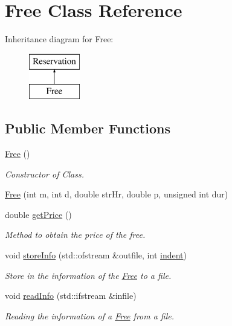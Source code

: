 \hypertarget{class_free}{}\section{Free Class Reference}
\label{class_free}
Inheritance diagram for Free\+:\begin{figure}[H]
\begin{center}
\leavevmode
\includegraphics[height=2.000000cm]{class_free}
\end{center}
\end{figure}
\subsection*{Public Member Functions}
\begin{DoxyCompactItemize}
\item 
\mbox{\label{class_free_a4a847fee0a934284fc4581282706e885}} 
\mbox{\hyperlink{class_free_a4a847fee0a934284fc4581282706e885}{Free}} ()
\begin{DoxyCompactList}\small\item\em Constructor of Class. \end{DoxyCompactList}\item 
\mbox{\hyperlink{class_free_afe1bb925d237595d9fd75fb2e7772314}{Free}} (int m, int d, double str\+Hr, double p, unsigned int dur)
\item 
double \mbox{\hyperlink{class_free_a229f009a7535eeba0a6ff4495de8c6bf}{get\+Price}} ()
\begin{DoxyCompactList}\small\item\em Method to obtain the price of the free. \end{DoxyCompactList}\item 
void \mbox{\hyperlink{class_free_a5eec9da16ebf4f388d16dd270bd93b64}{store\+Info}} (std\+::ofstream \&outfile, int \mbox{\hyperlink{class_reservation_a480981ed050bae19bc74bbb0bbb459f9}{indent}})
\begin{DoxyCompactList}\small\item\em Store in the information of the \mbox{\hyperlink{class_free}{Free}} to a file. \end{DoxyCompactList}\item 
void \mbox{\hyperlink{class_free_ad1023c825c9790edf0797e2e69dd2fcf}{read\+Info}} (std\+::ifstream \&infile)
\begin{DoxyCompactList}\small\item\em Reading the information of a \mbox{\hyperlink{class_free}{Free}} from a file. \end{DoxyCompactList}\end{DoxyCompactItemize}
